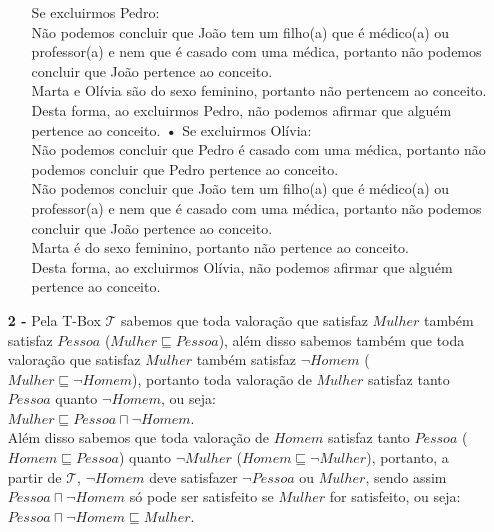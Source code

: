 \documentclass[12pt]{article}
\begin{document}
\begin{itemize}
\begin{itemize}
					Se excluirmos Pedro:\\
					Não podemos concluir que João tem um filho(a) que é médico(a) ou
					professor(a) e nem que é casado com uma médica, portanto não podemos concluir que João
					pertence ao conceito.\\
					Marta e Olívia são do sexo feminino, portanto não pertencem ao conceito.\\
					Desta forma, ao excluirmos Pedro, não podemos afirmar que alguém pertence ao
					conceito.
					\newline
					\subitem\textbf{•}
					Se excluirmos Olívia:\\
					Não podemos concluir que Pedro é casado com uma médica, portanto não podemos concluir que 
					Pedro pertence ao conceito.\\
					Não podemos concluir que João tem um filho(a) que é médico(a) ou
					professor(a) e nem que é casado com uma médica, portanto não podemos concluir que João
					pertence ao conceito.\\
					Marta é do sexo feminino, portanto não pertence ao conceito.\\
					Desta forma, ao excluirmos Olívia, não podemos afirmar que alguém pertence ao
					conceito.
			\end{itemize}
		\newpage
		\item[\textbf{2 -}]
			\hfill\newline
			Pela T-Box $\mathcal{T}$ sabemos que toda valoração que satisfaz $Mulher$ também satisfaz
			$Pessoa$ ($Mulher \sqsubseteq Pessoa$), além disso sabemos também que toda valoração
			que satisfaz $Mulher$ também satisfaz $\neg Homem$ ($Mulher \sqsubseteq \neg Homem$),
			portanto toda valoração de $Mulher$ satisfaz tanto $Pessoa$ quanto $\neg Homem$, ou seja:\\ 
			$Mulher \sqsubseteq Pessoa \sqcap \neg Homem$.\\
			
			Além disso sabemos que toda valoração de $Homem$ satisfaz tanto $Pessoa$ 
			($Homem \sqsubseteq Pessoa$) quanto $\neg Mulher$ ($Homem \sqsubseteq \neg Mulher$),
			portanto, a partir de $\mathcal{T}$, $\neg Homem$ deve satisfazer $\neg Pessoa$ ou
			$Mulher$, sendo assim $Pessoa \sqcap \neg Homem$ só pode ser satisfeito se $Mulher$
			for satisfeito, ou seja:\\
			$Pessoa \sqcap \neg Homem \sqsubseteq Mulher$.\\
			

\end{itemize}
\end{document}
